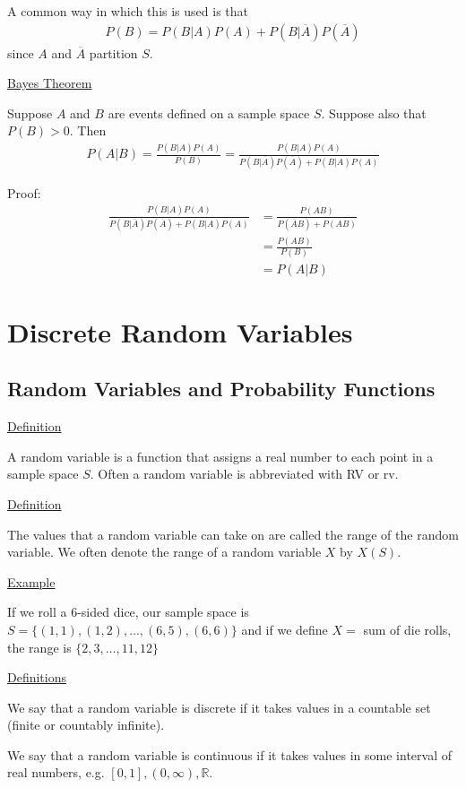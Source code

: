 \documentclass{article}
\begin{document}
A common way in which this is used is that 
\begin{align*}
    P(B) = P(B|A)P(A) + P(B|\overline{A})P(\overline{A})
\end{align*}
since $A$ and $\overline{A}$ partition $S$. 


\underline{Bayes Theorem}

Suppose $A$ and $B$ are events defined on a sample space $S$. Suppose also that $P(B) > 0$. Then
\begin{align*}
    P(A|B) = \frac{P(B|A)P(A)}{P(B)} = \frac{P(B|A)P(A)}{P(B|\overline{A})P(\overline{A}) + P(B|A)P(A)}
\end{align*}

Proof:
\begin{align*}
    \frac{P(B|A)P(A)}{P(B|\overline{A})P(\overline{A}) + P(B|A)P(A)} &= \frac{P(AB)}{P(\overline{A}B)+ P(AB)}\\
    &= \frac{P(AB)}{P(B)} \\
    &= P(A|B)
\end{align*}

\section{Discrete Random Variables}

\subsection{Random Variables and Probability Functions}

\underline{Definition}

A random variable is a function that assigns a real number to each point in a sample space $S$. Often a random variable is abbreviated with RV or rv.

\underline{Definition}

The values that a random variable can take on are called the range of the random variable. We often denote the range of a random variable $X$ by $X(S)$.

\underline{Example}

If we roll a 6-sided dice, our sample space is $S = \{(1,1),(1,2),\ldots,(6,5),(6,6)\}$ and if we define $X = $ sum of die rolls, the range is $\{2,3,\ldots,11,12\}$

\underline{Definitions}

We say that a random variable is discrete if it takes values in a countable set (finite or countably infinite).

We say that a random variable is continuous if it takes values in some interval of real numbers, e.g. $[0,1],(0,\infty),\mathbb{R}$.
\end{document}
